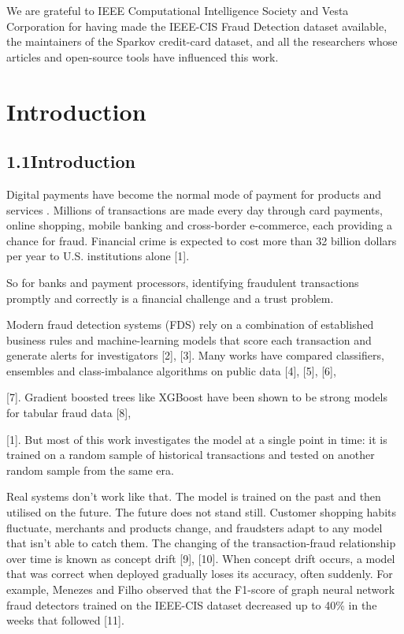 \documentclass[11pt,letterpaper]{report}
\begin{document}
We are grateful to IEEE Computational Intelligence Society and Vesta Corporation for having made the IEEE-CIS Fraud Detection dataset available, the maintainers of the Sparkov credit-card dataset, and all the researchers whose articles and open-source tools have influenced this work.

\renewcommand{\contentsname}{Table of Contents}
\tableofcontents
\clearpage
{}

\setcounter{chapter}{0}
\chapter{Introduction}

\section*{1.1\quad Introduction}

Digital payments have become the normal mode of payment for products and services . Millions of transactions are made every day through card payments, online shopping, mobile banking and cross-border e-commerce, each providing a chance for fraud. Financial crime is expected to cost more than 32 billion dollars per year to U.S. institutions alone [1].

So for banks and payment processors, identifying fraudulent transactions promptly and correctly is a financial challenge and a trust problem.

Modern fraud detection systems (FDS) rely on a combination of established business rules and machine-learning models that score each transaction and generate alerts for investigators [2], [3]. Many works have compared classifiers, ensembles and class-imbalance algorithms on public data [4], [5], [6],

[7]. Gradient boosted trees like XGBoost have been shown to be strong models for tabular fraud data [8],

[1]. But most of this work investigates the model at a single point in time: it is trained on a random sample of historical transactions and tested on another random sample from the same era.

Real systems don't work like that. The model is trained on the past and then utilised on the future. The future does not stand still. Customer shopping habits fluctuate, merchants and products change, and fraudsters adapt to any model that isn't able to catch them. The changing of the transaction-fraud relationship over time is known as concept drift [9], [10]. When concept drift occurs, a model that was correct when deployed gradually loses its accuracy, often suddenly. For example, Menezes and Filho observed that the F1-score of graph neural network fraud detectors trained on the IEEE-CIS dataset decreased up to 40\% in the weeks that followed [11].
\end{document}

